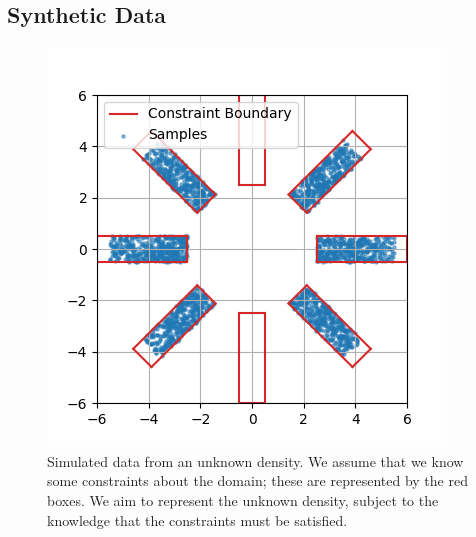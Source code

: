 \documentclass[letterpaper]{article} %
\begin{document}
\subsection{Synthetic Data}
\label{sec:illustrative_experiment}

\begin{figure}
  \centering
  \includegraphics[width=.39\textwidth]{images/synthetic_exp_generated_data.png}
  \caption{Simulated data from an unknown density. We assume that we know some constraints about the domain; these are represented by the red boxes. We aim to represent the unknown density, subject to the knowledge that the constraints must be satisfied.}
  \label{fig:data_samples_from_generated_data}
\end{figure}
\end{document}
